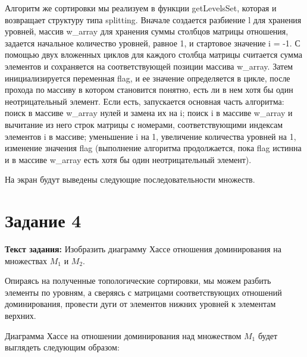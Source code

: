 \documentclass[12pt]{article}
\begin{document}
	Алгоритм же сортировки мы реализуем в функции getLevelsSet, которая и возвращает структуру типа splitting. Вначале создается разбиение l для хранения уровней, массив w\_array для хранения суммы столбцов матрицы отношения, задается начальное количество уровней, равное 1, и стартовое значение i = -1. С помощью двух вложенных циклов для каждого столбца матрицы считается сумма элементов и сохраняется на соответствующей позиции массива w\_array. Затем инициализируется переменная flag, и ее значение определяется в цикле, после прохода по массиву в котором становится понятно, есть ли в нем хотя бы один неотрицательный элемент. Если есть, запускается основная часть алгоритма: поиск в массиве w\_array нулей и замена их на i; поиск i в массиве w\_array и вычитание из него строк матрицы с номерами, соответствующими индексам элементов i в массиве; уменьшение i на 1, увеличение количества уровней на 1, изменение значения flag (выполнение алгоритма продолжается, пока flag истинна и в массиве w\_array есть хотя бы один неотрицательный элемент).
	
	 
	
	\newpage
	
	На экран будут выведены следующие последовательности множеств.
	
	\begin{figure}[bh]
		\noindent{}
	\end{figure}
	
	\section{Задание 4}
	\label{task4}

	{\bf Текст задания:} Изобразить диаграмму Хассе отношения доминирования на множествах $M_1$ и $M_2$. 
	
	Опираясь на полученные топологические сортировки, мы можем разбить элементы по уровням, а сверяясь с матрицами соответствующих отношений доминирования, провести дуги от элементов нижних уровней к элементам верхних.
	
	Диаграмма Хассе на отношении доминирования над множеством $M_1$ будет выглядеть следующим образом:
	
\end{document}
